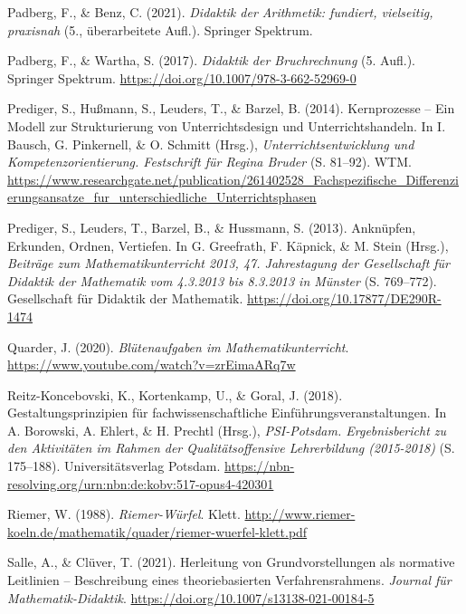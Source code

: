 \documentclass[
]{scrbook}
\newlength{\cslhangindent}
\newlength{\cslentryspacingunit} %
\newenvironment{CSLReferences}[2] %
 {%
  \setlength{\parindent}{0pt}
  \ifodd #1
  \let\oldpar\par
  \def\par{\hangindent=\cslhangindent\oldpar}
  \fi
  \setlength{\parskip}{#2\cslentryspacingunit}
 }%
 {}
\theoremstyle{definition}
\theoremstyle{definition}
\theoremstyle{definition}
\theoremstyle{definition}
\theoremstyle{remark}
\begin{document}
\begin{CSLReferences}{1}{0}
\leavevmode{}%
Padberg, F., \& Benz, C. (2021). \emph{Didaktik der {Arithmetik}: fundiert, vielseitig, praxisnah} (5., überarbeitete Aufl.). Springer Spektrum.

\leavevmode{}%
Padberg, F., \& Wartha, S. (2017). \emph{Didaktik der {Bruchrechnung}} (5. Aufl.). Springer Spektrum. \url{https://doi.org/10.1007/978-3-662-52969-0}

\leavevmode{}%
Prediger, S., Hußmann, S., Leuders, T., \& Barzel, B. (2014). Kernprozesse -- {Ein} {Modell} zur {Strukturierung} von {Unterrichtsdesign} und {Unterrichtshandeln}. In I. Bausch, G. Pinkernell, \& O. Schmitt (Hrsg.), \emph{Unterrichtsentwicklung und {Kompetenzorientierung}. {Festschrift} für {Regina} {Bruder}} (S. 81--92). WTM. \url{https://www.researchgate.net/publication/261402528_Fachspezifische_Differenzierungsansatze_fur_unterschiedliche_Unterrichtsphasen}

\leavevmode{}%
Prediger, S., Leuders, T., Barzel, B., \& Hussmann, S. (2013). Anknüpfen, {Erkunden}, {Ordnen}, {Vertiefen}. In G. Greefrath, F. Käpnick, \& M. Stein (Hrsg.), \emph{Beiträge zum {Mathematikunterricht} 2013, 47. {Jahrestagung} der {Gesellschaft} für {Didaktik} der {Mathematik} vom 4.3.2013 bis 8.3.2013 in {Münster}} (S. 769--772). Gesellschaft für Didaktik der Mathematik. \url{https://doi.org/10.17877/DE290R-1474}

\leavevmode{}%
Quarder, J. (2020). \emph{Blütenaufgaben im {Mathematikunterricht}}. \url{https://www.youtube.com/watch?v=zrEimaARq7w}

\leavevmode{}%
Reitz-Koncebovski, K., Kortenkamp, U., \& Goral, J. (2018). Gestaltungsprinzipien für fachwissenschaftliche {Einführungsveranstaltungen}. In A. Borowski, A. Ehlert, \& H. Prechtl (Hrsg.), \emph{{PSI}-{Potsdam}. {Ergebnisbericht} zu den {Aktivitäten} im {Rahmen} der {Qualitätsoffensive} {Lehrerbildung} (2015-2018)} (S. 175--188). Universitätsverlag Potsdam. \url{https://nbn-resolving.org/urn:nbn:de:kobv:517-opus4-420301}

\leavevmode{}%
Riemer, W. (1988). \emph{Riemer-{Würfel}}. Klett. \url{http://www.riemer-koeln.de/mathematik/quader/riemer-wuerfel-klett.pdf}

\leavevmode{}%
Salle, A., \& Clüver, T. (2021). Herleitung von {Grundvorstellungen} als normative {Leitlinien} -- {Beschreibung} eines theoriebasierten {Verfahrensrahmens}. \emph{Journal für Mathematik-Didaktik}. \url{https://doi.org/10.1007/s13138-021-00184-5}


\end{CSLReferences}
\end{document}
